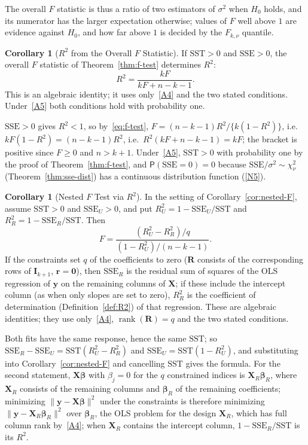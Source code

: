 \documentclass[12pt,a4paper]{article}
\makeatletter
\theoremstyle{definition}
\newtheorem{corollary}[theorem]{Corollary}
\renewenvironment{proof}[1][\proofname]{\par
  \pushQED{\qed}%
  \normalfont \topsep6\p@\@plus6\p@\relax
  \trivlist
  \item[\hskip\labelsep\bfseries #1\@addpunct{.}]\ignorespaces
}{%
  \popQED\endtrivlist\@endpefalse
}
\newcommand\prb{\mathsf{P}}
\DeclareMathOperator\rank{rank}
\newcommand{\SST}{\mathrm{SST}}
\newcommand{\SSE}{\mathrm{SSE}}
\newcommand{\bX}{\mathbf{X}}
\newcommand{\by}{\mathbf{y}}
\def\bb{\boldsymbol{\beta}}
\newcommand{\bI}{\mathbf{I}}
\newcommand{\bR}{\mathbf{R}}
\newcommand{\br}{\mathbf{r}}
\newcommand{\bzero}{\mathbf{0}}
\makeatother
\begin{document}
The overall $F$ statistic is thus a ratio of two estimators of $\sigma^2$ when $H_0$ holds, and its numerator has the larger expectation otherwise; values of $F$ well above $1$ are evidence against $H_0$, and how far above $1$ is decided by the $F_{k,\nu}$ quantile.

\begin{corollary}[$R^2$ from the Overall $F$ Statistic]\label{cor:R2-F}
If $\SST > 0$ and $\SSE > 0$, the overall $F$ statistic of Theorem~\ref{thm:f-test} determines $R^2$:
\[
R^2 = \frac{kF}{kF + n - k - 1}.
\]
This is an algebraic identity; it uses only~\ref{A4} and the two stated conditions. Under~\ref{A5} both conditions hold with probability one.
\end{corollary}

\begin{proof}
$\SSE > 0$ gives $R^2 < 1$, so by~\eqref{eq:f-test}, $F = (n-k-1)R^2/\{k(1 - R^2)\}$, i.e.\ $kF(1 - R^2) = (n-k-1)R^2$, i.e.\ $R^2(kF + n - k - 1) = kF$; the bracket is positive since $F \geqslant 0$ and $n > k + 1$. Under~\ref{A5}, $\SST > 0$ with probability one by the proof of Theorem~\ref{thm:f-test}, and $\prb(\SSE = 0) = 0$ because $\SSE/\sigma^2 \sim \chi^2_\nu$ (Theorem~\ref{thm:sse-dist}) has a continuous distribution function (\ref{N5}).
\end{proof}

\begin{corollary}[Nested $F$ Test via $R^2$]\label{cor:nested-R2}
In the setting of Corollary~\ref{cor:nested-F}, assume $\SST > 0$ and $\SSE_U > 0$, and put $R^2_U = 1 - \SSE_U/\SST$ and $R^2_R = 1 - \SSE_R/\SST$. Then
\[
F = \frac{(R^2_U - R^2_R)/q}{(1 - R^2_U)/(n-k-1)}.
\]
If the constraints set $q$ of the coefficients to zero ($\bR$ consists of the corresponding rows of $\bI_{k+1}$, $\br = \bzero$), then $\SSE_R$ is the residual sum of squares of the OLS regression of $\by$ on the remaining columns of $\bX$; if these include the intercept column (as when only slopes are set to zero), $R^2_R$ is the coefficient of determination (Definition~\ref{def:R2}) of that regression. These are algebraic identities; they use only~\ref{A4}, $\rank(\bR) = q$ and the two stated conditions.
\end{corollary}

\begin{proof}
Both fits have the same response, hence the same $\SST$; so $\SSE_R - \SSE_U = \SST(R^2_U - R^2_R)$ and $\SSE_U = \SST(1 - R^2_U)$, and substituting into Corollary~\ref{cor:nested-F} and cancelling $\SST$ gives the formula. For the second statement, $\bX\bb$ with $\beta_j = 0$ for the $q$ constrained indices is $\bX_R\bb_R$, where $\bX_R$ consists of the remaining columns and $\bb_R$ of the remaining coefficients; minimizing $\|\by - \bX\bb\|^2$ under the constraints is therefore minimizing $\|\by - \bX_R\bb_R\|^2$ over $\bb_R$, the OLS problem for the design $\bX_R$, which has full column rank by~\ref{A4}; when $\bX_R$ contains the intercept column, $1 - \SSE_R/\SST$ is its $R^2$.
\end{proof}
\end{document}
